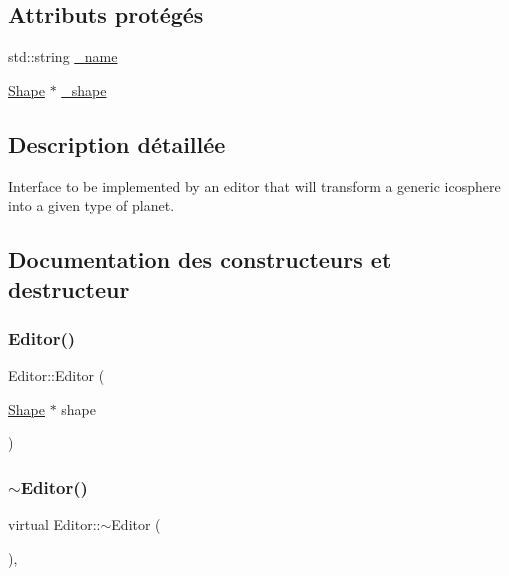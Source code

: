\subsection*{Attributs protégés}
\begin{DoxyCompactItemize}
\item 
std\+::string \hyperlink{class_editor_a0ae04e135284b48561a538397106f42a}{\+\_\+name}
\item 
\hyperlink{class_shape}{Shape} $\ast$ \hyperlink{class_editor_ad9f31fcae91fb4a91b5ff5ecb4308bdf}{\+\_\+shape}
\end{DoxyCompactItemize}


\subsection{Description détaillée}
Interface to be implemented by an editor that will transform a generic icosphere into a given type of planet. 

\subsection{Documentation des constructeurs et destructeur}
\mbox{\label{class_editor_aea7f803e3bbb79dbbeb9a9ad9b01ed5a}} 
\subsubsection{\texorpdfstring{Editor()}{Editor()}}
{\footnotesize\ttfamily Editor\+::\+Editor (\begin{DoxyParamCaption}\item[{\hyperlink{class_shape}{Shape} $\ast$}]{shape }\end{DoxyParamCaption})\hspace{0.3cm}{\ttfamily [inline]}}

\mbox{\label{class_editor_ab9aea98e4964b437a937354d2f3edd42}} 
\subsubsection{\texorpdfstring{$\sim$\+Editor()}{~Editor()}}
{\footnotesize\ttfamily virtual Editor\+::$\sim$\+Editor (\begin{DoxyParamCaption}{ }\end{DoxyParamCaption})\hspace{0.3cm}{\ttfamily [inline]}, {\ttfamily [virtual]}}

